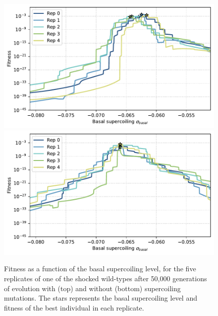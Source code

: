 \begin{figure}
\centering
\includegraphics[width=\textwidth]{epistasis/img/with-sc/fitness_landscapes_evolved_wt_01_shuffle_00.pdf}
\includegraphics[width=\textwidth]{epistasis/img/control/fitness_landscapes_evolved_wt_01_shuffle_00.pdf}
\caption[Supercoiling fitness landscapes after evolution after an environmental shock, with and without supercoiling mutations]{Fitness as a function of the basal supercoiling level, for the five replicates of one of the shocked wild-types after 50,000 generations of evolution with (top) and without (bottom) supercoiling mutations.
The stars represents the basal supercoiling level and fitness of the best individual in each replicate.}
\label{fig:epistasis:fitness-landscapes-evolved}
\end{figure}

